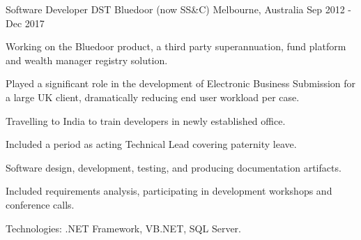 \begin{cventries}
\cventry
{Software Developer} %
{DST Bluedoor (now SS\&C)} %
{Melbourne, Australia} %
{Sep 2012 - Dec 2017} %
{
  \begin{cvitems} %
    \item {Working on the Bluedoor product, a third party superannuation, fund platform and wealth manager registry solution.}
    \item {Played a significant role in the development of Electronic Business Submission for a large UK client, dramatically reducing end user workload per case.}
    \item {Travelling to India to train developers in newly established office.}
    \item {Included a period as acting Technical Lead covering paternity leave.}
    \item {Software design, development, testing, and producing documentation artifacts.}
    \item {Included requirements analysis, participating in development workshops and conference calls.}
    \item {Technologies: .NET Framework, VB.NET, SQL Server.}
  \end{cvitems}
}

\end{cventries}
